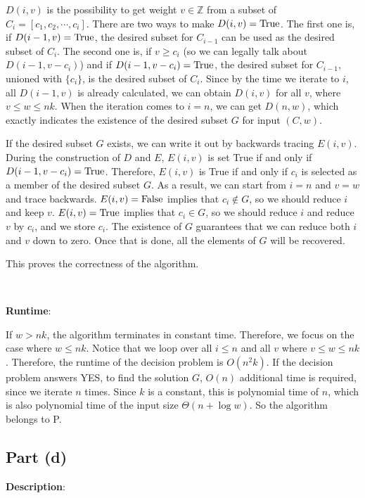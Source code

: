 \documentclass{article}
\begin{document}
$D(i,v)$ is the possibility to get weight $v\in\mathbb{Z}$ from a subset of $C_i=[c_1,c_2,\cdots,c_i]$. There are two ways to make $D(i,v)=\textup{True}$. The first one is, if $D(i-1,v)=\textup{True}$, the desired subset for $C_{i-1}$ can be used as the desired subset of $C_i$. The second one is, if $v\geqslant c_i$ (so we can legally talk about $D(i-1,v-c_i)$) and if $D(i-1,v-c_i)=\textup{True}$, the desired subset for $C_{i-1}$, unioned with $\{c_i\}$, is the desired subset of $C_i$. Since by the time we iterate to $i$, all $D(i-1,v)$ is already calculated, we can obtain $D(i,v)$ for all $v$, where $v\leqslant w\leqslant nk$. When the iteration comes to $i=n$, we can get $D(n,w)$, which exactly indicates the existence of the desired subset $G$ for input $(C,w)$.

If the desired subset $G$ exists, we can write it out by backwards tracing $E(i,v)$. During the construction of $D$ and $E$, $E(i,v)$ is set True if and only if $D(i-1,v-c_i)=\textup{True}$. Therefore, $E(i,v)$ is True if and only if $c_i$ is selected as a member of the desired subset $G$. As a result, we can start from $i=n$ and $v=w$ and trace backwards. $E(i,v)=\textup{False}$ implies that $c_i\notin G$, so we should reduce $i$ and keep $v$. $E(i,v)=\textup{True}$ implies that $c_i\in G$, so we should reduce $i$ and reduce $v$ by $c_i$, and we store $c_i$. The existence of $G$ guarantees that we can reduce both $i$ and $v$ down to zero. Once that is done, all the elements of $G$ will be recovered.

This proves the correctness of the algorithm.

~

\noindent\textbf{Runtime}:

If $w>nk$, the algorithm terminates in constant time. Therefore, we focus on the case where $w\leqslant nk$. Notice that we loop over all $i\leqslant n$ and all $v$ where $v\leqslant w\leqslant nk$. Therefore, the runtime of the decision problem is $O(n^2k)$. If the decision problem answers YES, to find the solution $G$, $O(n)$ additional time is required, since we iterate $n$ times. Since $k$ is a constant, this is polynomial time of $n$, which is also polynomial time of the input size $\Theta(n+\log w)$. So the algorithm belongs to P.

\subsection{Part (d)}
\noindent\textbf{Description}:
\end{document}
